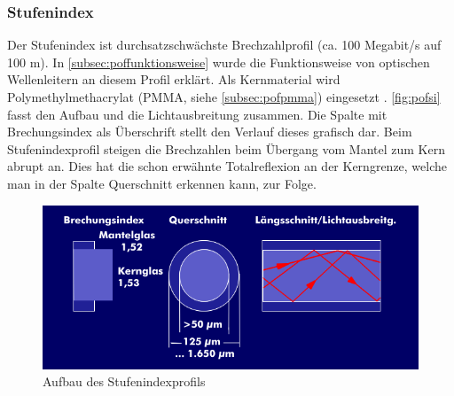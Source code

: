 \subsubsection{Stufenindex}

Der Stufenindex ist durchsatzschwächste Brechzahlprofil (ca. 100 Megabit/s auf
100 m). In \autoref{subsec:poffunktionsweise} wurde die Funktionsweise von
optischen Wellenleitern an diesem Profil erklärt. Als Kernmaterial wird
Polymethylmethacrylat (PMMA, siehe \autoref{subsec:pofpmma}) eingesetzt
\cite{pofacsi}. \autoref{fig:pofsi} fasst den Aufbau und die Lichtausbreitung
zusammen. Die Spalte mit Brechungsindex als Überschrift stellt den Verlauf
dieses grafisch dar. Beim Stufenindexprofil steigen die Brechzahlen beim
Übergang vom Mantel zum Kern abrupt an. Dies hat die schon erwähnte
Totalreflexion an der Kerngrenze, welche man in der Spalte Querschnitt erkennen
kann, zur Folge.

\begin{figure}[h]
    \begin{center}
        \begin{minipage}[t]{0.4\textwidth}
            \begin{center}
                \includegraphics[height=0.1\textheight]{Bilder/Optische_Wellenleiter_Die_Polymer_Optische_Faser/Brechzahlprofile/pofsi.png}
                \caption[Aufbau des Stufenindexprofils \newline \url{ITWissen}]{Aufbau des Stufenindexprofils}
                \label{fig:pofsi}
            \end{center}
        \end{minipage}
    \end{center}
\end{figure}


